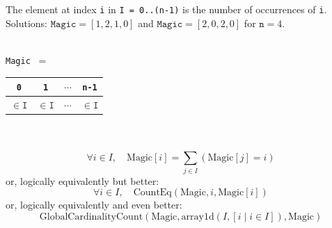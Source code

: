 \documentclass{cons-beamer}
\begin{document}
\begin{frame}
  \begin{example}
    The element at index \texttt{i} in \texttt{I = 0..(n-1)} is
    the number of occurrences of \texttt{i}.  Solutions:
    $\mathtt{Magic}=[1,2,1,0]$ and
    $\mathtt{Magic}=[2,0,2,0]$ for $\mathtt{n}=4$. \\~\\

    

    \texttt{Magic} ~=~
    \begin{tabular}{cccc}
      \texttt{0} & \texttt{1} & $\cdots$ & \texttt{n-1} \\
      \hline
      \multicolumn{1}{|c|}{$\in \mathtt{I}$} &
      \multicolumn{1}{|c|}{$\in \mathtt{I}$} &
      \multicolumn{1}{|c|}{$\cdots$} &
      \multicolumn{1}{|c|}{$\in \mathtt{I}$} \\
      \hline
    \end{tabular} \\~\\ 

	\small
    \[ \forall i \in I, \quad \text{Magic}[i] = \sum_{j \in I} (\text{Magic}[j] = i) \] 
    or, logically equivalently but better:
    \[ \forall i \in I, \quad \text{CountEq}(\text{Magic}, i, \text{Magic}[i]) \] 
    or, logically equivalently and even better:
    \[ \text{GlobalCardinalityCount}(\text{Magic}, \text{array1d}(I, [i \mid i \in I]), \text{Magic}) \]
  \end{example}
\end{frame}
\end{document}
